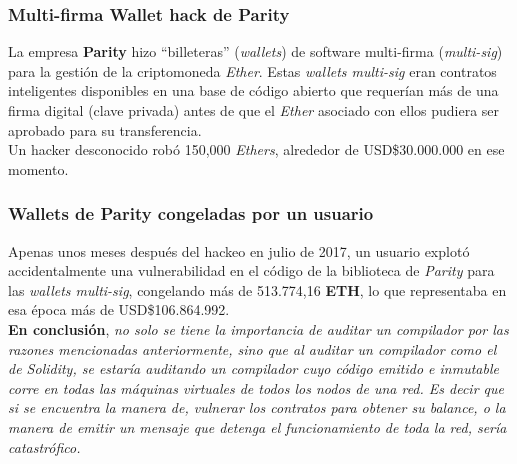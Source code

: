 \subsubsection{Multi-firma Wallet hack de Parity}
La empresa \textbf{Parity} hizo “billeteras” (\textit{wallets}) de software multi-firma (\textit{multi-sig}) para la gestión de la criptomoneda \textit{Ether}. Estas \textit{wallets multi-sig} eran contratos inteligentes disponibles en una base de código abierto que requerían más de una firma digital (clave privada) antes de que el \textit{Ether} asociado con ellos pudiera ser aprobado para su transferencia.\\

Un hacker desconocido robó 150,000 \textit{Ethers}, alrededor de USD\$30.000.000 en ese momento\cite{parityheist}.

\subsubsection{Wallets de Parity congeladas por un usuario}
Apenas unos meses después del hackeo en julio de 2017, un usuario explotó accidentalmente una vulnerabilidad en el código de la biblioteca de \textit{Parity} para las \textit{wallets multi-sig}, congelando más de 513.774,16 \textbf{ETH}, lo que representaba en esa época más de USD\$106.864.992\cite{parityfreeze}.\\

\textbf{En conclusión},\textit{ no solo se tiene la importancia de auditar un compilador por las razones mencionadas anteriormente, sino que al auditar un compilador como el de Solidity, se estaría auditando un compilador cuyo código emitido e inmutable corre en todas las máquinas virtuales de todos los nodos de una red. Es decir que si se encuentra la manera de, vulnerar los contratos para obtener su balance, o la manera de emitir un mensaje que detenga el funcionamiento de toda la red, sería catastrófico.}
